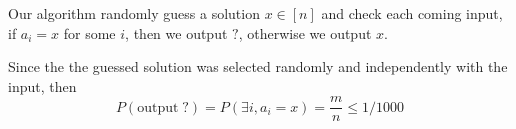Our algorithm randomly guess a solution $x\in[n]$ and check each coming input, if $a_i=x$ for some $i$, then we output $?$, otherwise we output $x$.

Since the the guessed solution was selected randomly and independently with the input, then
\[
	P(\mathrm{output}\;?)=P(\exists i,a_i=x)=\frac{m}{n}\leq1/1000
\]

